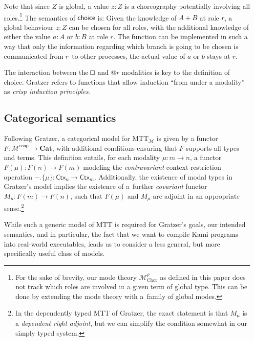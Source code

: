 \documentclass{scrartcl}
\renewcommand{\square}{\mathop{\mathchoice%
  {\tikz{\draw (0,0) rectangle (0.2cm,0.2cm);}}%
  {\tikz{\draw (0,0) rectangle (0.2cm,0.2cm);}}%
  {\tikz{\draw (0,0) rectangle (0.15cm,0.15cm);}}%
  {\tikz{\draw (0,0) rectangle (0.10cm,0.10cm);}}}}
\theoremstyle{definition}
\theoremstyle{plain}
\begin{document}
Note that since $Z$ is global, a value $z : Z$ is a choreography potentially
involving all roles.\footnote{For the sake of brevity, our mode theory
  $\mathcal{M}^{\rho}_{\textrm{Chor}}$ as defined in this paper does not track
  which roles are involved in a given term of global type. This can be done by
  extending the mode theory with a~family of global modes.}
The semantics of $\textsf{choice}$ is: Given the knowledge of $A + B$ at role
$r$, a global behaviour $z : Z$ can be chosen for all roles, with the
additional knowledge of either the value $a : A$ or $b : B$ at role $r$. The
function can be implemented in such a way that only the information regarding
which branch is going to be chosen is communicated from $r$~to other processes,
the actual value of $a$ or $b$ stays at $r$.

The interaction between the $\square$ and $@r$ modalities is key to the
definition of \textsf{choice}. Gratzer refers to functions that allow induction
``from under a modality'' as \emph{crisp induction
principles}\cite[§6.3.1]{gratzer2023syntax}.



\subsection{Categorical semantics}
Following Gratzer, a categorical model for MTT$_{\mathcal{M}}$ is given by a
functor $F : \mathcal{M}^{\textsf{coop}} \to \textbf{Cat}$, with additional
conditions ensuring that $F$ supports all types and terms. This definition
entails, for each modality $\mu : m \to n$, a functor $F(\mu) : F(n) \to F(m)$
modeling the \emph{contravariant} context restriction operation ${-}.\{\mu\} :
\textsf{Ctx}_n \to \textsf{Ctx}_m$. Additionally, the existence of modal types
in Gratzer's model implies the existence of a~further \emph{covariant} functor
$M_\mu : F(m) \to F(n)$, such that $F(\mu)$ and $M_\mu$ are adjoint in an
appropriate sense.\footnote{In the dependently typed MTT of Gratzer, the exact
  statement is that $M_\mu$ is a \emph{dependent right adjoint}, but we can
  simplify the condition somewhat in our simply typed system.}

While such a generic model of MTT is required for Gratzer's goals, our intended
semantics, and in particular, the fact that we want to compile Kami programs
into real-world executables, leads us to consider a less general, but more
specifically useful class of models.
\end{document}
